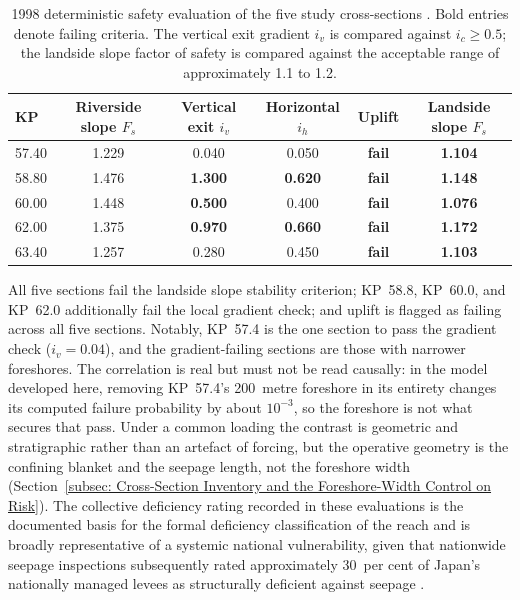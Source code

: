 \begin{table}[htbp]
\centering
\footnotesize
\caption{1998 deterministic safety evaluation of the five study cross-sections \parencite{oyo_1999}. Bold entries denote failing criteria. The vertical exit gradient $i_v$ is compared against $i_c \geq 0.5$; the landside slope factor of safety is compared against the acceptable range of approximately 1.1 to 1.2.}
\label{tab:oyo_1998}
\begin{tabular}{lccccc}
\toprule
KP & Riverside slope $F_s$ & Vertical exit $i_v$ & Horizontal $i_h$ & Uplift & Landside slope $F_s$ \\
\midrule
57.40 & 1.229 & 0.040          & 0.050          & \textbf{fail} & \textbf{1.104} \\
58.80 & 1.476 & \textbf{1.300} & \textbf{0.620} & \textbf{fail} & \textbf{1.148} \\
60.00 & 1.448 & \textbf{0.500} & 0.400          & \textbf{fail} & \textbf{1.076} \\
62.00 & 1.375 & \textbf{0.970} & \textbf{0.660} & \textbf{fail} & \textbf{1.172} \\
63.40 & 1.257 & 0.280          & 0.450          & \textbf{fail} & \textbf{1.103} \\
\bottomrule
\end{tabular}
\end{table}

All five sections fail the landside slope stability criterion; KP~58.8, KP~60.0, and KP~62.0 additionally fail the local gradient check; and uplift is flagged as failing across all five sections. Notably, KP~57.4 is the one section to pass the gradient check ($i_v = 0.04$), and the gradient-failing sections are those with narrower foreshores. The correlation is real but must not be read causally: in the model developed here, removing KP~57.4's 200~metre foreshore in its entirety changes its computed failure probability by about $10^{-3}$, so the foreshore is not what secures that pass. Under a common loading the contrast is geometric and stratigraphic rather than an artefact of forcing, but the operative geometry is the confining blanket and the seepage length, not the foreshore width (Section~\ref{subsec: Cross-Section Inventory and the Foreshore-Width Control on Risk}). The collective deficiency rating recorded in these evaluations is the documented basis for the formal deficiency classification of the reach \parencite{fukuda_2025_internal} and is broadly representative of a systemic national vulnerability, given that nationwide seepage inspections subsequently rated approximately 30~per cent of Japan's nationally managed levees as structurally deficient against seepage \parencite{pwri_2013}.

